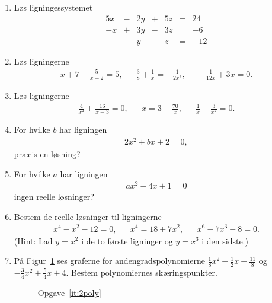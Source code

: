 \begin{enumerate}
\item Løs ligningessystemet
\begin{alignat*}{5}
x&{}-{}&2y&{}+{}&5z&{}={}&24\\
-x&{}+{}&3y&{}-{}&3z&{}={}&-6\\
&{}-{}&y&{}-{}& z&{}={}&-12
\end{alignat*}


\item Løs ligningerne 
\begin{align*}
x+7-\frac{5}{x-2}=5, && \frac{3}{8}+\frac{1}{x}=-\frac{1}{2x^2},&& -\frac{1}{12x}+3x=0.
\end{align*}

\item Løs ligningerne
\begin{align*}
 \frac{4}{x^2}+\frac{16}{x-3}=0,&& x=3+\frac{70}{x},&& \frac{1}{x}- \frac{3}{x^2}=0.
\end{align*}

\item For hvilke $b$ har ligningen
\begin{align*}
2x^2+bx+2=0,
\end{align*}
præcis en løsning?

\item For hvilke $a$ har ligningen 
\begin{align*}
ax^2-4x+1=0
\end{align*}
ingen reelle løsninger?

\item Bestem de reelle løsninger til ligningerne
\begin{align*}
x^4-x^2-12=0,&& x^4=18+7x^2,&& x^6-7x^3-8=0.
\end{align*}
(Hint: Lad $y=x^2$ i de to første ligninger og $y=x^3$ i den sidste.)


\item \label{it:2poly} På Figur~\ref{fig:2poly} ses graferne for andengradspolynomierne $\frac{1}{8}x^2-\frac{1}{2}x+\frac{11}{8}$ og $-\frac{3}{4}x^2+\frac{5}{4}x+4$. Bestem polynomiernes skæringspunkter. 
\begin{figure}
\centering
{}
\caption{Opgave~\ref{it:2poly}}
\label{fig:2poly}
\end{figure}


\end{enumerate}
